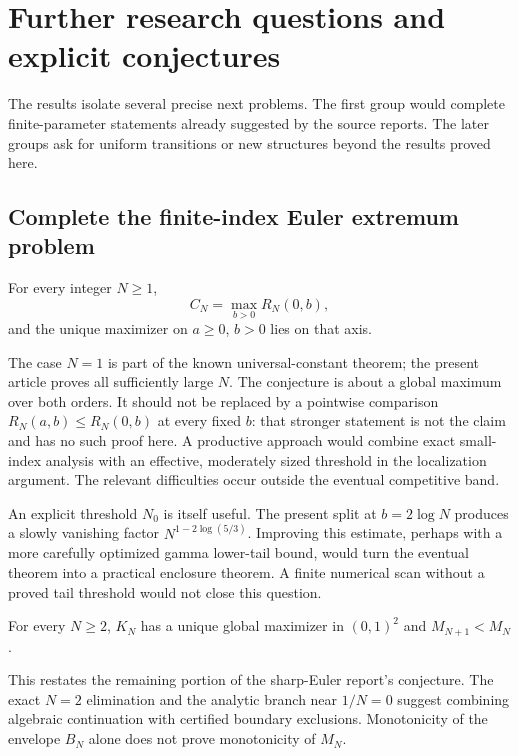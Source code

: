 \section{Further research questions and explicit conjectures}
\label{sec:research-agenda}

The results isolate several precise next problems. The first group
would complete finite-parameter statements already suggested by the
source reports. The later groups ask for uniform transitions or new
structures beyond the results proved here.

\subsection{Complete the finite-index Euler extremum problem}

\begin{conjecture}
\label{conj:all-index-axis}
For every integer $N\geq1$,
\[
 C_N=\max_{b>0}R_N(0,b),
\]
and the unique maximizer on $a\geq0$, $b>0$ lies on that axis.
\end{conjecture}

The case $N=1$ is part of the known universal-constant theorem;
the present article proves all sufficiently large $N$. The conjecture
is about a global maximum over both orders. It should not be replaced
by a pointwise comparison $R_N(a,b)\leq R_N(0,b)$ at every fixed $b$:
that stronger statement is not the claim and has no such proof here.
A productive approach would combine exact small-index analysis with
an effective, moderately sized threshold in the localization argument.
The relevant difficulties occur outside the eventual competitive band.

An explicit threshold $N_0$ is itself useful. The present split at
$b=2\log N$ produces a slowly vanishing factor
$N^{1-2\log(5/3)}$. Improving this estimate, perhaps with a more
carefully optimized gamma lower-tail bound, would turn the eventual
theorem into a practical enclosure theorem. A finite numerical scan
without a proved tail threshold would not close this question.

\begin{conjecture}
\label{conj:all-index-kernel}
For every $N\geq2$, $K_N$ has a unique global maximizer in $(0,1)^2$
and $M_{N+1}<M_N$.
\end{conjecture}

This restates the remaining portion of the sharp-Euler report's
conjecture. The exact $N=2$ elimination and the analytic branch near
$1/N=0$ suggest combining algebraic continuation with certified
boundary exclusions. Monotonicity of the envelope $B_N$ alone does
not prove monotonicity of $M_N$.

